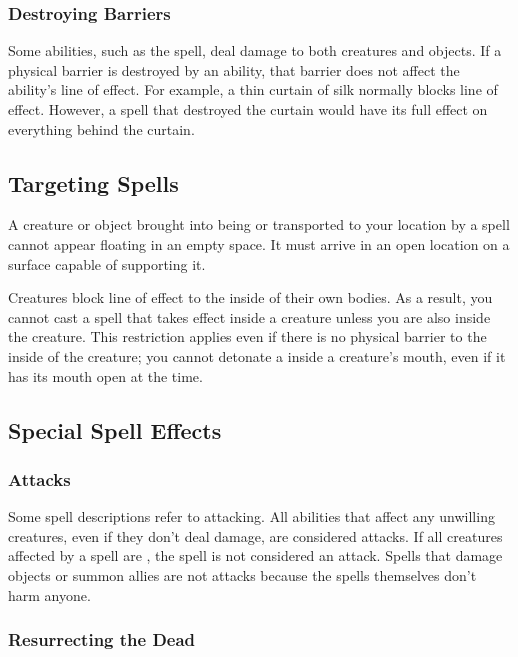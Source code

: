         \subsubsection{Destroying Barriers}\label{Destroying Barriers}
            Some abilities, such as the  spell, deal damage to both creatures and objects.
            If a physical barrier is destroyed by an ability, that barrier does not affect the ability's line of effect.
            For example, a thin curtain of silk normally blocks line of effect.
            However, a spell that destroyed the curtain would have its full effect on everything behind the curtain.

    \subsection{Targeting Spells}

         A creature or object brought into being or transported to your location by a spell cannot appear floating in an empty space.
        It must arrive in an open location on a surface capable of supporting it.

         Creatures block line of effect to the inside of their own bodies.
        As a result, you cannot cast a spell that takes effect inside a creature unless you are also inside the creature.
        This restriction applies even if there is no physical barrier to the inside of the creature; you cannot detonate a  inside a creature's mouth, even if it has its mouth open at the time.

    \subsection{Special Spell Effects}

        \subsubsection{Attacks}
            Some spell descriptions refer to attacking.
            All abilities that affect any unwilling creatures, even if they don't deal damage, are considered attacks.
            If all creatures affected by a spell are , the spell is not considered an attack.
            Spells that damage objects or summon allies are not attacks because the spells themselves don't harm anyone.

        \subsubsection{Resurrecting the Dead}\label{Resurrecting the Dead}

